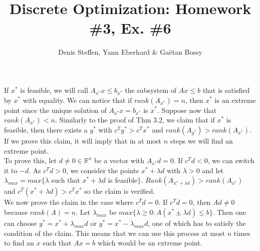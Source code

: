 \documentclass[a4paper,11pt,french]{article}
\title{Discrete Optimization: Homework \#3, Ex. \#6}
\author{Denis Steffen, Yann Eberhard \& Gaëtan Bossy}
\begin{document}
\maketitle
If $x^*$ is feasible, we will call $A_{x^*}x\leq b_{x^*}$ the subsystem of $Ax\leq b$ that is satisfied by $x^*$ with equality. 
We can notice that if $rank(A_{x^*}) = n$, then $x^*$ is an extreme point since the unique solution of $A_{x^*}x = b_{x^*}$ is $x^*$.
Suppose now that $rank(A_{x^*}) < n$. Similarly to the proof of Thm 3.2, we claim that if $x^*$ is feasible, then there exists a $y^*$ with $c^T y^* > c^T x^*$ and $rank(A_{y^*}) > rank(A_{x^*})$. If we prove this claim, it will imply that in at most $n$ steps we will find an extreme point.\\
To prove this, let $d \not= 0 \in \mathbb{R}^n$ be a vector with $A_{x^*}d = 0$. If $c^T d < 0$, we can switch it to $-d$. As $c^T d > 0$, we consider the points $x^* + \lambda d$ with $\lambda> 0$ and let $\lambda_{max}=max\{\lambda$ such that $x^* + \lambda d$ is feasible$\}$. 
$Rank(A_{x^*+\lambda d})>rank(A_{x^*})$ and $c^T(x^*+\lambda d)>c^Tx^*$ so the claim is verified. \\
We now prove the claim in the case where $c^T d = 0$. If $c^Td=0$, then $Ad \not= 0$ because $rank(A) = n$. 
Let $\lambda_{max}$ be $max\{\lambda \geq 0: A(x^*\pm\lambda d) \leq b\}$. Then one can choose $y^* = x^* + \lambda_{max}d$ or
$y^* = x^* - \lambda_{max}d$, one of which has to satisfy the condition of the claim. 
This means that we can use this process at most $n$ times to find an $x$ such that $Ax=b$ which would be an extreme point.
\end{document}
